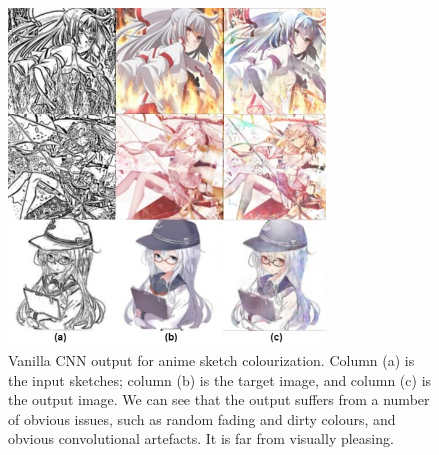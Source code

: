 \begin{figure}
    \centering
    \includegraphics[width=0.75\textwidth]{images/colorization/cnn.jpg}
    \caption[Vanilla CNN output for anime sketch colourization.]{Vanilla CNN output for anime sketch colourization. Column (a) is the input sketches; column (b) is the target image, and column (c) is the output image.\cite{fransOutlineColorizationTandem2017} We can see that the output suffers from a number of obvious issues, such as random fading and dirty colours, and obvious convolutional artefacts. It is far from visually pleasing.} 
    \label{fig:colorization_cnn}
\end{figure}

